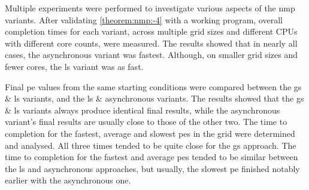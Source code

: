 Multiple experiments were performed to investigate various aspects of the \gls{nmp} variants.  After validating \cref{theorem:nmp:-4} with a working program, overall completion times for each variant, across multiple grid sizes and different CPUs with different core counts, were measured.  The results showed that in nearly all cases, the asynchronous variant was fastest.  Although, on smaller grid sizes and fewer cores, the \gls{ls} variant was as fast.

Final \gls{pe} values from the same starting conditions were compared between the \gls{gs} \& \gls{ls} variants, and the \gls{ls} \& asynchronous variants.  The results showed that the \gls{gs} \& \gls{ls} variants always produce identical final results, while the asynchronous variant's final results are usually close to those of the other two.  The time to completion for the fastest, average and slowest \glspl{pe} in the grid were determined and analysed.  All three times tended to be quite close for the \gls{gs} approach.  The time to completion for the fastest and average \glspl{pe} tended to be similar between the \gls{ls} and asynchronous approaches, but usually, the slowest \gls{pe} finished notably earlier with the asynchronous one.